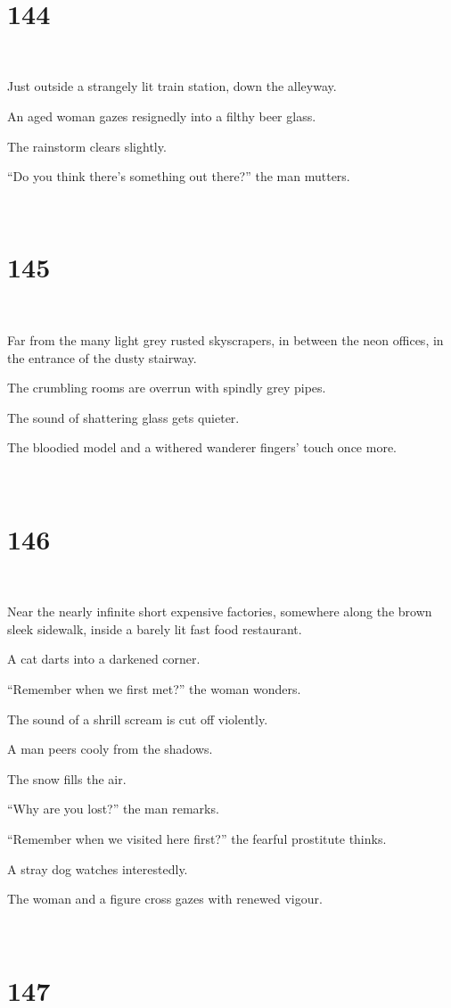 \documentclass{report}
\begin{document}
~
\chapter*{144}
~

Just outside a strangely lit train station, down the alleyway.

An aged woman gazes resignedly into a filthy beer glass.

The rainstorm clears slightly.

``Do you think there's something out there?'' the man mutters.

~
\chapter*{145}
~

Far from the many light grey rusted skyscrapers, in between the neon offices, in the entrance of the dusty stairway.

The crumbling rooms are overrun with spindly grey pipes.

The sound of shattering glass gets quieter.

The bloodied model and a withered wanderer fingers' touch once more.

~
\chapter*{146}
~

Near the nearly infinite short expensive factories, somewhere along the brown sleek sidewalk, inside a barely lit fast food restaurant.

A cat darts into a darkened corner.

``Remember when we first met?'' the woman wonders.

The sound of a shrill scream is cut off violently.

A man peers cooly from the shadows.

The snow fills the air.

``Why are you lost?'' the man remarks.

``Remember when we visited here first?'' the fearful prostitute thinks.

A stray dog watches interestedly.

The woman and a figure cross gazes with renewed vigour.

~
\chapter*{147}
~
\end{document}
